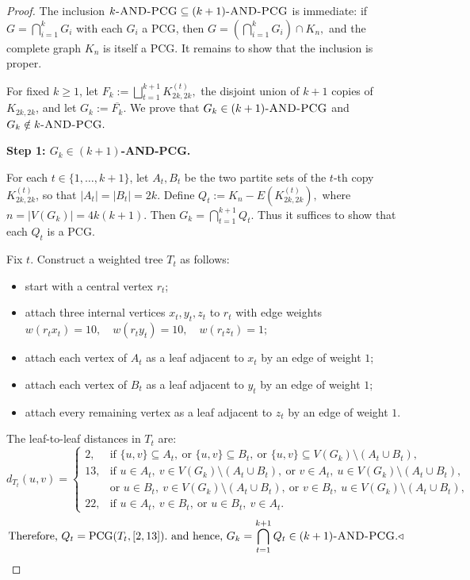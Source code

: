 \documentclass[a4paper,UKenglish,cleveref,autoref,thm-restate]{socg-lipics-v2021}
\begin{document}
\begin{proof}
The inclusion
\(
k\textsc{-AND-\textsc{PCG}} \subseteq (k+1)\textsc{-AND-\textsc{PCG}}
\)
is immediate: if
\(
G=\bigcap_{i=1}^k G_i
\)
with each $G_i$ a \textsc{PCG}, then
\(
G=\left(\bigcap_{i=1}^k G_i\right)\cap K_{n},
\)
and the complete graph $K_{n}$ is itself a \textsc{PCG}. It remains to show that the inclusion is proper.

For fixed $k\ge 1$, let
\(
F_k:=\bigsqcup_{t=1}^{k+1} K^{(t)}_{2k,2k},
\)
the disjoint union of $k+1$ copies of $K_{2k,2k}$, and let
\(
G_k:=\overline{F_k}.
\)
We prove that
\(
G_k\in (k+1)\textsc{-AND-\textsc{PCG}}\) and \(G_k\notin k\textsc{-AND-\textsc{PCG}}.
\)

\medskip
\noindent\textbf{Step 1: \(G_k\in (k+1)\)-AND-PCG.}

For each $t\in\{1,\dots,k+1\}$, let $A_t,B_t$ be the two partite sets of the $t$-th copy
\(K^{(t)}_{2k,2k}\), so that \(|A_t|=|B_t|=2k\). Define
\(
Q_t:=K_n-E\!\left(K^{(t)}_{2k,2k}\right),
\)
where \(n=|V(G_k)|=4k(k+1)\). Then
\(
G_k=\bigcap_{t=1}^{k+1}Q_t.
\)
Thus it suffices to show that each \(Q_t\) is a \textsc{PCG}.

Fix \(t\). Construct a weighted tree \(T_t\) as follows:
\begin{itemize}
    \item start with a central vertex \(r_t\);
    \item attach three internal vertices \(x_t,y_t,z_t\) to \(r_t\) with edge weights
    \(
    w(r_tx_t)=10,\quad   w(r_ty_t)=10,\quad w(r_tz_t)=1;
    \)
    \item attach each vertex of \(A_t\) as a leaf adjacent to \(x_t\) by an edge of weight \(1\);
    \item attach each vertex of \(B_t\) as a leaf adjacent to \(y_t\) by an edge of weight \(1\);
    \item attach every remaining vertex as a leaf adjacent to \(z_t\) by an edge of weight \(1\).
\end{itemize}


The leaf-to-leaf distances in \(T_t\) are:
\[
d_{T_t}(u,v)=
\begin{cases}
2, & \text{if } \{u,v\}\subseteq A_t,\ \text{or } \{u,v\}\subseteq B_t,\ \text{or } \{u,v\}\subseteq V(G_k)\setminus (A_t\cup B_t),\\[4pt]
13, & \text{if } u\in A_t,\ v\in V(G_k)\setminus (A_t\cup B_t),\ \text{or } v\in A_t,\ u\in V(G_k)\setminus (A_t\cup B_t),\\
& \text{or } u\in B_t,\ v\in V(G_k)\setminus (A_t\cup B_t),\ \text{or } v\in B_t,\ u\in V(G_k)\setminus (A_t\cup B_t),\\[4pt]
22, & \text{if } u\in A_t,\ v\in B_t,\ \text{or } u\in B_t,\ v\in A_t.
\end{cases}
\]
\[
\text{Therefore, }
Q_t=\operatorname{PCG}(T_t,[2,13]).
\text{ and hence, }
G_k=\bigcap_{t=1}^{k+1}Q_t\in (k+1)\textsc{-AND-\textsc{PCG}}.\hfill\triangleleft
\]


\end{proof}
\end{document}
